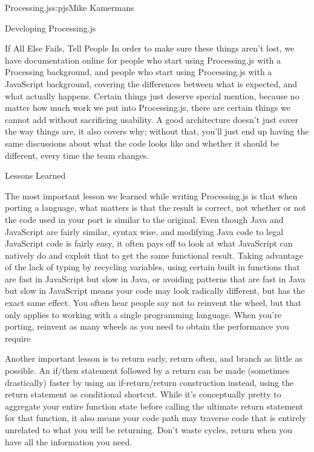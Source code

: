 \begin{aosachapter}{Processing.js}{s:pjs}{Mike Kamermans}
\begin{aosasect1}{Developing Processing.js}
\begin{aosasect2}{If All Else Fails, Tell People}
In order to make sure these things aren't lost, we have documentation
online for people who start using Processing.js with a Processing
background, and people who start using Processing.js with a JavaScript
background, covering the differences between what is expected, and
what actually happens. Certain things just deserve special mention,
because no matter how much work we put into Processing.js, there are
certain things we cannot add without sacrificing usability. A good
architecture doesn't just cover the way things are, it also covers
why; without that, you'll just end up having the same discussions
about what the code looks like and whether it should be different,
every time the team changes.

\end{aosasect2}

\end{aosasect1}

\begin{aosasect1}{Lessons Learned}

The most important lesson we learned while writing Processing.js is
that when porting a language, what matters is that the result is
correct, not whether or not the code used in your port is similar to
the original. Even though Java and JavaScript are fairly similar,
syntax wise, and modifying Java code to legal JavaScript code is
fairly easy, it often pays off to look at what JavaScript can natively
do and exploit that to get the same functional result. Taking
advantage of the lack of typing by recycling variables, using certain
built in functions that are fast in JavaScript but slow in Java, or
avoiding patterns that are fast in Java but slow in JavaScript means
your code may look radically different, but has the exact same
effect. You often hear people say not to reinvent the wheel, but that
only applies to working with a single programming language. When
you're porting, reinvent as many wheels as you need to obtain the
performance you require

Another important lesson is to return early, return often, and branch
as little as possible. An if/then statement followed by a return can
be made (sometimes drastically) faster by using an if-return/return
construction instead, using the return statement as conditional
shortcut. While it's conceptually pretty to aggregate your entire
function state before calling the ultimate return statement for that
function, it also means your code path may traverse code that is
entirely unrelated to what you will be returning. Don't waste cycles,
return when you have all the information you need.


\end{aosasect1}
\end{aosachapter}
